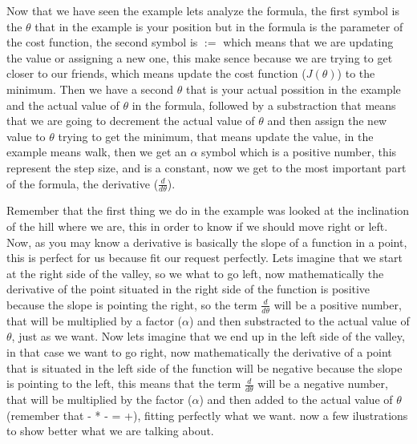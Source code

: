 \documentclass[12pt,journal]{IEEEtran}
\begin{document}
    Now that we have seen the example lets analyze the formula, the first symbol
    is the $\theta$ that in the example is your position but in the
    formula is the parameter of the cost function, the second symbol is $:=$
    which means that we are updating the value or assigning a new one,
    this make sence because we are trying to get closer to our friends, which
    means update the cost function ($J(\theta)$) to the minimum. Then we
    have a second $\theta$ that is your actual possition in the example and
    the actual value of $\theta$ in the formula, followed by a substraction
    that means that we are going to decrement the actual value of $\theta$
    and then assign the new value to $\theta$ trying to get the minimum,
    that means update the value, in the example means walk, then we get an
    $\alpha$ symbol which is a positive number, this represent the step size,
    and is a constant, now we get to the most important part of the formula, the
    derivative ($\frac{d}{d \theta}$).

    Remember that the first thing we do in the example was looked at the
    inclination of the hill where we are, this in order to know if we should
    move right or left. Now, as you may know a derivative is basically the
    slope of a function in a point, this is perfect for us because fit our
    request perfectly. Lets imagine that we start at the right side of the
    valley, so we what to go left, now mathematically the derivative of the
    point situated in the right side of the function is positive because the
    slope is pointing the right, so the term $\frac{d}{d \theta}$ will be a
    positive number, that will be multiplied by a factor ($\alpha$) and then
    substracted to the actual value of $\theta$, just as we want.
    Now lets imagine that we end up in the left side of the valley, in that case
    we want to go right, now mathematically the derivative of a point that is
    situated in the left side of the function will be negative because the
    slope is pointing to the left, this means that the term $\frac{d}{d \theta}$
    will be a negative number, that will be multiplied by the factor ($\alpha$)
    and then added to the actual value of $\theta$ (remember that - * - = +),
    fitting perfectly what we want. now a few ilustrations to show better what we
    are talking about.

    \vspace{3cm}
\end{document}
